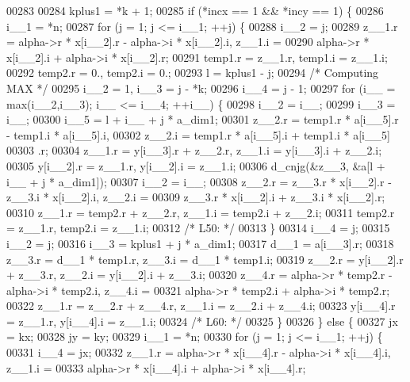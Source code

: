 \begin{DoxyCode}
00283 
00284     kplus1 = *k + 1;
00285     \textcolor{keywordflow}{if} (*incx == 1 && *incy == 1) \{
00286         i\_\_1 = *n;
00287         \textcolor{keywordflow}{for} (j = 1; j <= i\_\_1; ++j) \{
00288         i\_\_2 = j;
00289         z\_\_1.r = alpha->r * x[i\_\_2].r - alpha->i * x[i\_\_2].i, z\_\_1.i =
00290              alpha->r * x[i\_\_2].i + alpha->i * x[i\_\_2].r;
00291         temp1.r = z\_\_1.r, temp1.i = z\_\_1.i;
00292         temp2.r = 0., temp2.i = 0.;
00293         l = kplus1 - j;
00294 \textcolor{comment}{/* Computing MAX */}
00295         i\_\_2 = 1, i\_\_3 = j - *k;
00296         i\_\_4 = j - 1;
00297         \textcolor{keywordflow}{for} (i\_\_ = max(i\_\_2,i\_\_3); i\_\_ <= i\_\_4; ++i\_\_) \{
00298             i\_\_2 = i\_\_;
00299             i\_\_3 = i\_\_;
00300             i\_\_5 = l + i\_\_ + j * a\_dim1;
00301             z\_\_2.r = temp1.r * a[i\_\_5].r - temp1.i * a[i\_\_5].i, 
00302                 z\_\_2.i = temp1.r * a[i\_\_5].i + temp1.i * a[i\_\_5]
00303                 .r;
00304             z\_\_1.r = y[i\_\_3].r + z\_\_2.r, z\_\_1.i = y[i\_\_3].i + z\_\_2.i;
00305             y[i\_\_2].r = z\_\_1.r, y[i\_\_2].i = z\_\_1.i;
00306             d\_cnjg(&z\_\_3, &a[l + i\_\_ + j * a\_dim1]);
00307             i\_\_2 = i\_\_;
00308             z\_\_2.r = z\_\_3.r * x[i\_\_2].r - z\_\_3.i * x[i\_\_2].i, z\_\_2.i =
00309                  z\_\_3.r * x[i\_\_2].i + z\_\_3.i * x[i\_\_2].r;
00310             z\_\_1.r = temp2.r + z\_\_2.r, z\_\_1.i = temp2.i + z\_\_2.i;
00311             temp2.r = z\_\_1.r, temp2.i = z\_\_1.i;
00312 \textcolor{comment}{/* L50: */}
00313         \}
00314         i\_\_4 = j;
00315         i\_\_2 = j;
00316         i\_\_3 = kplus1 + j * a\_dim1;
00317         d\_\_1 = a[i\_\_3].r;
00318         z\_\_3.r = d\_\_1 * temp1.r, z\_\_3.i = d\_\_1 * temp1.i;
00319         z\_\_2.r = y[i\_\_2].r + z\_\_3.r, z\_\_2.i = y[i\_\_2].i + z\_\_3.i;
00320         z\_\_4.r = alpha->r * temp2.r - alpha->i * temp2.i, z\_\_4.i = 
00321             alpha->r * temp2.i + alpha->i * temp2.r;
00322         z\_\_1.r = z\_\_2.r + z\_\_4.r, z\_\_1.i = z\_\_2.i + z\_\_4.i;
00323         y[i\_\_4].r = z\_\_1.r, y[i\_\_4].i = z\_\_1.i;
00324 \textcolor{comment}{/* L60: */}
00325         \}
00326     \} \textcolor{keywordflow}{else} \{
00327         jx = kx;
00328         jy = ky;
00329         i\_\_1 = *n;
00330         \textcolor{keywordflow}{for} (j = 1; j <= i\_\_1; ++j) \{
00331         i\_\_4 = jx;
00332         z\_\_1.r = alpha->r * x[i\_\_4].r - alpha->i * x[i\_\_4].i, z\_\_1.i =
00333              alpha->r * x[i\_\_4].i + alpha->i * x[i\_\_4].r;

\end{DoxyCode}
